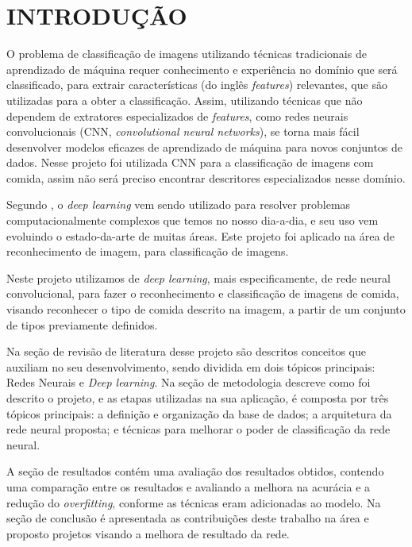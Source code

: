 
\chapter{INTRODUÇÃO}
\label{chap:introducao}
O problema de classificação de imagens utilizando técnicas tradicionais de aprendizado de máquina requer conhecimento e experiência no domínio que será classificado, para extrair características (do inglês \textit{features}) relevantes, que são utilizadas para a obter a classificação. Assim, utilizando técnicas que não dependem de extratores especializados de \textit{features}, como redes neurais convolucionais (CNN, \textit{convolutional neural networks}), se torna mais fácil desenvolver modelos eficazes de aprendizado de máquina para novos conjuntos de dados. Nesse projeto foi utilizada CNN para a classificação de imagens com comida, assim não será preciso encontrar descritores especializados nesse domínio. 
\par Segundo \cite{lecun2015deep}, o \textit{deep learning} vem sendo utilizado para resolver problemas computacionalmente complexos que temos no nosso dia-a-dia, e seu uso vem evoluindo o estado-da-arte de muitas áreas. Este projeto foi aplicado na área de reconhecimento de imagem, para classificação de imagens.
\par Neste projeto utilizamos de \textit{deep learning}, mais especificamente, de rede neural convolucional, para fazer o reconhecimento e classificação de imagens de comida, visando reconhecer o tipo de comida descrito na imagem, a partir de um conjunto de tipos previamente definidos.
\par Na seção de revisão de literatura desse projeto são descritos conceitos que auxiliam no seu desenvolvimento, sendo dividida em dois tópicos principais: Redes Neurais e \textit{Deep learning}. Na seção de metodologia descreve como foi descrito o projeto, e as etapas utilizadas na sua aplicação, é composta por três tópicos principais: a definição e organização da base de dados; a arquitetura da rede neural proposta; e técnicas para melhorar o poder de classificação da rede neural.
\par A seção de resultados contém uma avaliação dos resultados obtidos, contendo uma comparação entre os resultados e avaliando a melhora na acurácia e a redução do \textit{overfitting}, conforme as técnicas eram adicionadas ao modelo. Na seção de conclusão é apresentada as contribuições deste trabalho na área e proposto projetos visando a melhora de resultado da rede.
